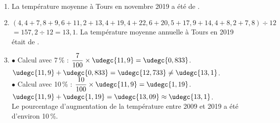    \ \\ [-5mm]
      \begin{enumerate}
      \item La température moyenne à Tours en novembre 2019 a été de {\blue {}}.
      \item $(4,4+7,8+9,6+11,2+13,4+19,4+22,6+20,5+17,9+ 14,4+8,2+7,8)\div12$ \\
         $=157,2\div12 =13,1$. {\blue La température moyenne annuelle à Tours en 2019 était de }. \smallskip
         \item \textcolor{G1}{$\bullet$} Calcul avec 7\,\% : $\dfrac{7}{100}\times\udegc{11,9} =\udegc{0,833}$. \\ [1mm]
            $\udegc{11,9}+\udegc{0,833} =\udegc{12,733} \neq\udegc{13,1}$. \\ [1mm]
            \textcolor{G1}{$\bullet$} Calcul avec  10\,\% : $\dfrac{10}{100}\times\udegc{11,9} =\udegc{1,19}$. \\ [1mm]
            $\udegc{11,9}+\udegc{1,19} =\udegc{13,09} \approx\udegc{13,1}$. \\
           {\blue Le pourcentage d'augmentation de la température entre 2009 et 2019 a été d'environ 10\,\%}.
   \end{enumerate}

